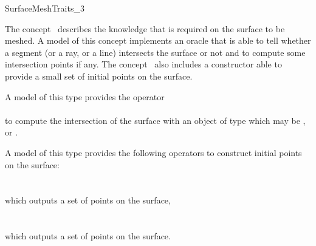 

\begin{ccRefConcept}{SurfaceMeshTraits_3}


\ccDefinition
  
The concept \ccRefName\ describes the knowledge that is required on the
surface to be meshed. A model of this concept
implements an oracle that is able to tell whether a segment
(or a ray,  or a line) intersects the surface or not
and to compute some intersection
points if any. The concept \ccRefName\ also includes a constructor able  to provide
a small set of initial points on the surface.


\ccTypes

\ccGlue
{}
\ccGlue
{}
\ccGlue
{}
\ccGlue
{}


{A model of this type provides the operator \\
\\
to compute the intersection of the surface  
with an object of type  which may  be 
,  or  .}


{A model of this type provides the following operators
to construct initial points on the surface: \\
\\
\\
which outputs a set of points on the surface,\\
\\
 \\
which outputs a set of  points on the surface.}



\end{ccRefConcept}
